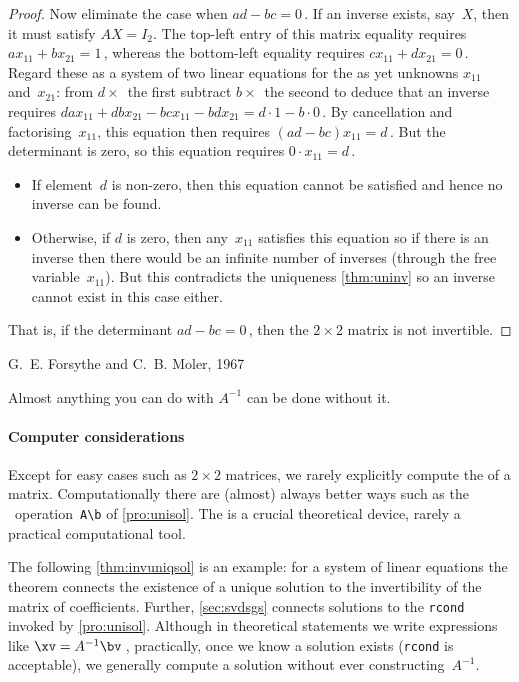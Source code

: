 \begin{proof}
Now eliminate the case when \(ad-bc=0\)\,.
If an inverse exists, say~\(X\), then it must satisfy \(AX=I_2\).
The top-left entry of this matrix equality requires \(ax_{11}+bx_{21}=1\)\,, whereas the bottom-left equality requires \(cx_{11}+dx_{21}=0\)\,.
Regard these as a system of two linear equations for the as yet unknowns \(x_{11}\) and~\(x_{21}\): from \(d\times\)~the first subtract \(b\times\)~the second to deduce that an inverse requires
\(dax_{11}+dbx_{21}-bcx_{11}-bdx_{21}=d\cdot1-b\cdot0\)\,.
By cancellation and factorising~\(x_{11}\), this equation then requires \((ad-bc)x_{11}=d\)\,.
But the determinant is zero, so this equation requires \(0\cdot x_{11}=d\)\,.
\begin{itemize}
\item If element~\(d\) is non-zero, then this equation cannot be satisfied and hence no inverse can be found.
\item Otherwise, if \(d\) is zero, then any~\(x_{11}\) satisfies this equation so if there is an inverse then there would be an infinite number of inverses (through the free variable~\(x_{11}\)).
But this contradicts the uniqueness \autoref{thm:uninv} so an inverse cannot exist in this case either.
\end{itemize}
That is, if the determinant \(ad-bc=0\)\,, then the \(2\times2\) matrix is not invertible.
\end{proof}



\begin{quoted}{\parbox[t]{0.5\linewidth}{G.~E. Forsythe and C.~B. Moler, 1967 \cite[p.261]{Higham1996}}}
Almost anything you can do with \(A^{-1}\) can be done without it.
\end{quoted}


\paragraph{Computer considerations} 
Except for easy cases such as \(2\times2\) matrices, we rarely explicitly compute the  of a matrix.
Computationally there are (almost) always better ways such as the \script\ operation~\verb|A\b| of \autoref{pro:unisol}.
The  is a crucial theoretical device, rarely a practical computational tool.


The following \autoref{thm:invuniqsol} is an example: for a system of linear equations the theorem connects the existence of a unique solution to the invertibility of the matrix of coefficients.
Further, \autoref{sec:svdsgs} connects solutions to the \verb|rcond| invoked by \autoref{pro:unisol}.
Although in theoretical statements we write expressions like \(\xv=A^{-1}\bv\)\,,
practically, once we know a solution exists (\verb|rcond| is acceptable), we generally compute a solution without ever constructing~\(A^{-1}\).



